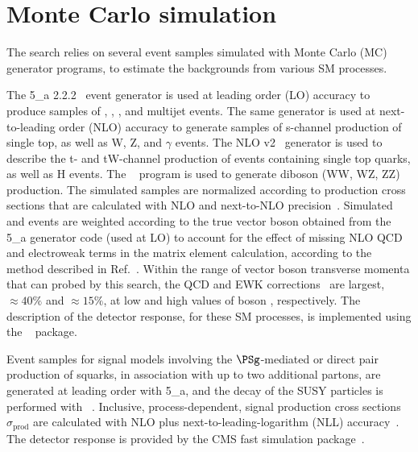 
\section{Monte Carlo simulation}
\label{sec:simulation}

The search relies on several event samples simulated with Monte Carlo
(MC) generator programs, to estimate the backgrounds from various SM
processes.

The {\MADGRAPH{}5\_a\MCATNLO} 2.2.2~\cite{Alwall2014} event generator
is used at leading order (LO) accuracy to produce samples of \wj, \zj,
\ttbar, and multijet events. The same generator is used at
next-to-leading order (NLO) accuracy to generate samples of s-channel
production of single top, as well as {\ttbar}W, {\ttbar}Z, and
{\ttbar}$\gamma$ events. The NLO \POWHEG v2~\cite{powheg,
  powheg_top_Wt} generator is used to describe the t- and tW-channel
production of events containing single top quarks, as well as
{\ttbar}H events. The ~\cite{pythia} program is used to
generate diboson (WW, WZ, ZZ) production. The simulated samples are
normalized according to production cross sections that are calculated
with NLO and next-to-NLO precision~\cite{Alwall2014, wphys, fewz,
  wwxs, top++, nlotop, powheg_top_Wt}. Simulated \wj and \zj events
are weighted according to the true vector boson \pt obtained from the
{\MADGRAPH{}5\_a\MCATNLO} generator code (used at LO) to account for
the effect of missing NLO QCD and electroweak terms in the matrix
element calculation, according to the method described in
Ref.~\cite{Khachatryan:2016mdm}. Within the range of vector boson
transverse momenta that can probed by this search, the QCD and EWK
corrections~\cite{Kuhn:2005gv} are largest, ${\approx}40\%$ and
${\approx}15\%$, at low and high values of boson \pt,
respectively. The description of the detector response, for these SM
processes, is implemented using the \GEANTfour~\cite{geant} package.

Event samples for signal models involving the $\PSg$-mediated or
direct pair production of squarks, in association with up to two
additional partons, are generated at leading order with
{\MADGRAPH{}5\_a\MCATNLO}, and the decay of the SUSY particles is
performed with ~\cite{pythia}. Inclusive,
process-dependent, signal production cross sections
$\sigma_\text{prod}$ are calculated with NLO plus
next-to-leading-logarithm (NLL) accuracy~\cite{Beenakker:1996ch,
  PhysRevLett.102.111802, PhysRevD.80.095004, 1126-6708-2009-12-041,
  doi:10.1142/S0217751X11053560, susynlo}. The detector response is
provided by the CMS fast simulation package~\cite{fastsim}.


